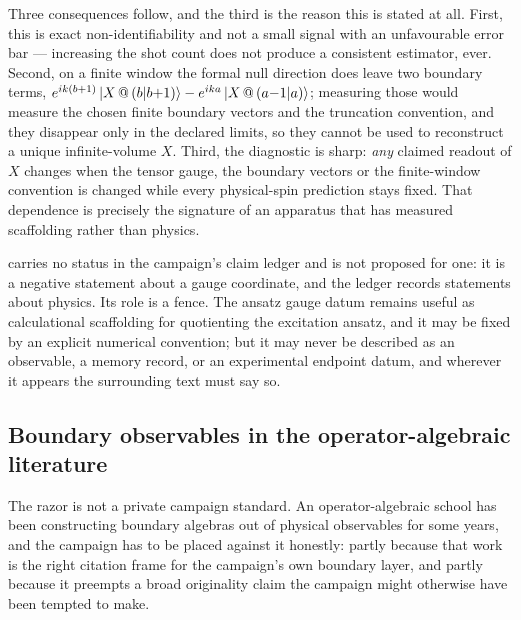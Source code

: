 Three consequences follow, and the third is the reason this is stated at all.
First, this is exact non-identifiability and not a small signal with an
unfavourable error bar --- increasing the shot count does not produce a
consistent estimator, ever. Second, on a finite window the formal null
direction does leave two boundary terms,
$e^{ik(b+1)}\,|X\,@\,(b|b{+}1)\rangle-e^{ika}\,|X\,@\,(a{-}1|a)\rangle$; measuring
those would measure the chosen finite boundary vectors and the truncation
convention, and they disappear only in the declared limits, so they cannot be
used to reconstruct a unique infinite-volume $X$. Third, the diagnostic is
sharp: \emph{any} claimed readout of $X$ changes when the tensor gauge, the
boundary vectors or the finite-window convention is changed while every
physical-spin prediction stays fixed. That dependence is precisely the
signature of an apparatus that has measured scaffolding rather than physics.

\begin{remark}
\label{rem:op-x-fence}
 carries no status in the campaign's claim ledger and
is not proposed for one: it is a negative statement about a gauge coordinate,
and the ledger records statements about physics. Its role is a fence. The
ansatz gauge datum remains useful as calculational scaffolding for quotienting
the excitation ansatz, and it may be fixed by an explicit numerical convention;
but it may never be described as an observable, a memory record, or an
experimental endpoint datum, and wherever it appears the surrounding text must
say so.
\end{remark}


\subsection{Boundary observables in the operator-algebraic literature}
\label{sec:op-boundary-lit}

The razor is not a private campaign standard. An operator-algebraic school has
been constructing boundary algebras out of physical observables for some years,
and the campaign has to be placed against it honestly: partly because that work
is the right citation frame for the campaign's own boundary layer, and partly
because it preempts a broad originality claim the campaign might otherwise have
been tempted to make.

